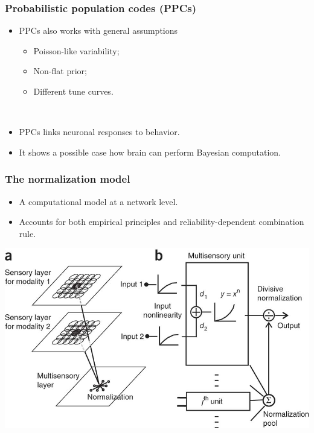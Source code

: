 \documentclass{beamer}
\begin{document}
\begin{frame}
  \frametitle{Probabilistic population codes (PPCs) \cite{ma_bayesian_2006}}
  \begin{itemize}
    \item PPCs also works with general assumptions
    \begin{itemize}
      \item Poisson-like variability;
      \item Non-flat prior;
      \item Different tune curves.
    \end{itemize}

    ~
    \item PPCs links neuronal responses to behavior.
    \item It shows a possible case how brain can perform Bayesian computation.
  \end{itemize}
\end{frame}

\begin{frame}
  \frametitle{The normalization model \cite{ohshiro_normalization_2011}}
  \begin{itemize}
    \item A computational model at a network level.
    \item Accounts for both empirical principles and reliability-dependent combination rule.
  \end{itemize}
  \begin{center}
    \includegraphics[width=.8\textwidth]{normalize}
  \end{center}
\end{frame}
\end{document}
